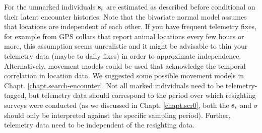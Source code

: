 For the unmarked individuals ${\bf s}_{i}$ are estimated as described
before conditional on their latent encounter histories.  Note that the
bivariate normal model assumes that locations are independent of each
other. If you have frequent telemetry fixes, for example from GPS
collars that report animal locations every few hours or more, this
assumption seems unrealistic and it might be advisable to thin your
telemetry data (maybe to daily fixes) in order to approximate
independence.  Alternatively, movement models could be used that
acknowledge the temporal correlation in location data. We suggested
some possible movement models in Chapt. \ref{chapt.search-encounter}.
Not all marked individuals need to be telemetry-tagged, but telemetry
data should correspond to the period over which resighting surveys
were conducted (as we discussed in Chapt. \ref{chapt.scr0}, both the
${\bf s}_i$ and $\sigma$ should only be interpreted against the
specific sampling period). Further, telemetry data need to be
independent of the resighting data.

